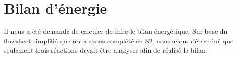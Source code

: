 \documentclass[11pt,a4paper]{report}
\author{Groupe 1246}
\begin{document}
\section{Bilan d'énergie}
Il nous a été demandé de calculer de faire le bilan énergétique. Sur base du flowsheet simplifié que nous avons complété en S2, nous avons déterminé que seulement trois réactions devait être analyser afin de réalisé le bilan:
\end{document}
